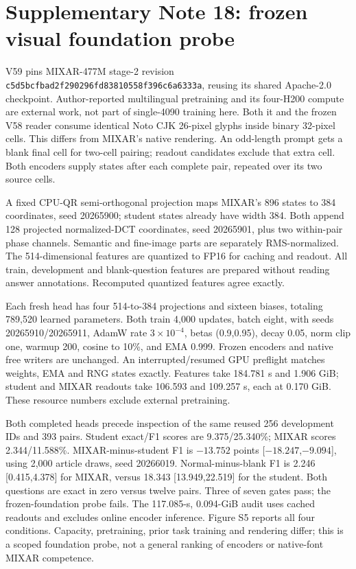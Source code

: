 \documentclass[10pt,a4paper]{article}
\begin{document}
\section*{Supplementary Note 18: frozen visual foundation probe}
V59 pins MIXAR-477M stage-2 revision
\texttt{c5d5bcfbad2f290296fd83810558f396c6a6333a}, reusing its shared
Apache-2.0 checkpoint. Author-reported multilingual pretraining and its
four-H200 compute are external work, not part of single-4090 training here.
Both it and the frozen V58 reader consume identical Noto CJK 26-pixel glyphs
inside binary 32-pixel cells. This differs from MIXAR's native rendering.
An odd-length prompt gets a blank final cell for two-cell pairing; readout
candidates exclude that extra cell. Both encoders supply states after each
complete pair, repeated over its two source cells.

A fixed CPU-QR semi-orthogonal projection maps MIXAR's 896 states to 384
coordinates, seed 20265900; student states already have width 384. Both append
128 projected normalized-DCT coordinates, seed 20265901, plus two within-pair
phase channels. Semantic and fine-image parts are separately RMS-normalized.
The 514-dimensional features are quantized to FP16 for caching and readout.
All train, development and blank-question features are prepared without
reading answer annotations. Recomputed quantized features agree exactly.

Each fresh head has four 514-to-384 projections and sixteen biases, totaling
789,520 learned parameters. Both train 4,000 updates, batch eight, with seeds
20265910/20265911, AdamW rate $3\times10^{-4}$, betas (0.9,0.95), decay 0.05,
norm clip one, warmup 200, cosine to 10\%, and EMA 0.999. Frozen encoders and
native free writers are unchanged. An interrupted/resumed GPU preflight
matches weights, EMA and RNG states exactly. Features take 184.781 s and
1.906 GiB; student and MIXAR readouts take 106.593 and 109.257 s, each at
0.170 GiB. These resource numbers exclude external pretraining.

Both completed heads precede inspection of the same reused 256 development
IDs and 393 pairs. Student exact/F1 scores are 9.375/25.340\%; MIXAR scores
2.344/11.588\%. MIXAR-minus-student F1 is $-13.752$ points
[$-18.247$,$-9.094$], using 2,000 article draws, seed 20266019.
Normal-minus-blank F1 is 2.246 [0.415,4.378] for MIXAR, versus 18.343
[13.949,22.519] for the student. Both questions are exact in zero versus
twelve pairs. Three of seven gates pass; the frozen-foundation probe fails.
The 117.085-s, 0.094-GiB audit uses cached readouts and excludes online encoder
inference. Figure S5 reports all four conditions. Capacity, pretraining,
prior task training and rendering differ; this is a scoped foundation probe,
not a general ranking of encoders or native-font MIXAR competence.
\end{document}
